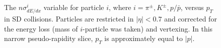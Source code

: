 \begin{figure}[H]
{\begin{subfigure}[b]{\linewidth}{
				}
		\end{subfigure}
	}
	\parbox{0.484\textwidth}{
			\centering
			\begin{subfigure}[b]{\linewidth}{
					}
			\end{subfigure}
		}
	\caption[The $n\sigma^{i}_{dE/dx}$ variable versus $p_T$ in SD collisions]{The $n\sigma^{i}_{dE/dx}$ variable for particle $i$, where $i=\pi^\pm, K^\pm, p/\bar{p}$, versus $p_T$ in SD collisions. Particles are restricted in $|\eta| < 0.7$
		and corrected for the energy loss (mass of $i$-particle was taken) and vertexing. In
		this narrow pseudo-rapidity slice, $p_T$ is approximately
		equal to $|p|$.}
	\label{fig:nsigma}
\end{figure}

